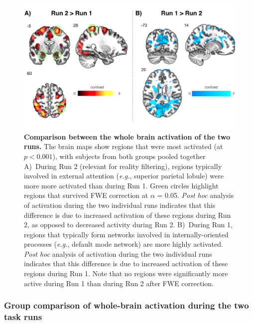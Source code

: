 \begin{figure}[h]
\centering\includegraphics[width=1\linewidth]{images/Ch4/Ch4_CtrlVsPre_R1_R2.png}
\caption{\textbf{Comparison between the whole brain activation of the two runs.} The brain maps show regions that were most activated  (at $p < 0.001$), with subjects from both groups pooled together A)~During Run 2 (relevant for reality filtering), regions typically involved in external attention (\textit{e.g.}, superior parietal lobule) were more more activated than during Run 1. Green circles highlight regions that survived FWE correction at $\alpha$ = 0.05. \textit{Post hoc} analysis of activation during the two individual runs indicates that this difference is due to increased activation of these regions during Run 2, as opposed to decreased activity during Run 2.  B)~During Run 1, regions that typically form networks involved in  internally-oriented processes (\textit{e.g.}, default mode network) are more highly activated. \textit{Post hoc} analysis of activation during the two individual runs indicates that this difference is due to increased activation of these regions during Run 1. Note that no regions were significantly more active during Run 1 than during Run 2 after FWE correction.}  \label{fig:RunActivation}
\end{figure}

\subsubsection{Group comparison of whole-brain activation during the two task runs}

